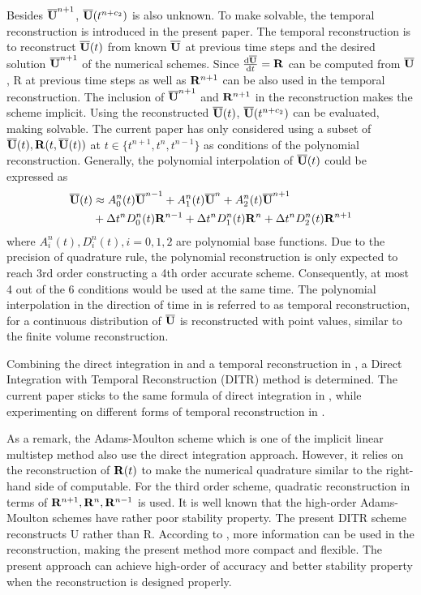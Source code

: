 Besides $\overline{\mathbf{U}}^{n+1}$, $\overline{\mathbf{U}}(t^{n+c_2})$ is also unknown.
To make 
solvable, the temporal reconstruction is introduced in the
present paper.
The temporal reconstruction is to reconstruct $\overline{\mathbf{U}}(t)$
from known $\overline{\mathbf{U}}$ at previous time steps and the desired
solution $\overline{\mathbf{U}}^{n+1}$ of the numerical schemes. Since $\frac{\dd\overline{\mathbf{U}}}{\dd t}=\mathbf{R}$
can be computed from  $\overline{\mathbf{U}}$, R at previous time steps as well
as  $\mathbf{R}^{n+1}$ can be also used in the temporal reconstruction.
The inclusion of $\overline{\mathbf{U}}^{n+1}$ and $\mathbf{R}^{n+1}$ in the reconstruction
makes the scheme implicit.
Using the reconstructed $\overline{\mathbf{U}}(t)$, $\overline{\mathbf{U}}(t^{n+c_2})$
can be evaluated, making  solvable.
The current paper has only considered using a subset of
$\overline{\mathbf{U}}(t), \mathbf{R}(t, \overline{\mathbf{U}}(t))$ at $t \in \{t^{n+1}, t^n, t^{n-1}\}$
as conditions of the polynomial reconstruction.
Generally, the polynomial interpolation
of $\overline{\mathbf{U}}(t)$ could be expressed as
\begin{equation}
    \begin{aligned}
        \label{eq:TR}
        \overline{\mathbf{U}}(t) & \approx
        A^n_0(t)\overline{\mathbf{U}}^{n - 1} +
        A^n_1(t)\overline{\mathbf{U}}^{n} +
        A^n_2(t)\overline{\mathbf{U}}^{n + 1}
        \\ & +
        \mathrm\Delta t^n D^n_0(t)\mathbf{R}^{n - 1} +
        \mathrm\Delta t^n D^n_1(t)\mathbf{R}^{n} +
        \mathrm\Delta t^n D^n_2(t)\mathbf{R}^{n + 1}
    \end{aligned}
\end{equation}
where $A^n_i(t), D^n_i(t), i=0,1,2$
are polynomial base functions. Due to the precision of quadrature rule,
the polynomial reconstruction is only expected to reach 3rd order
constructing a 4th order accurate scheme.
Consequently, at most 4 out of the
6 conditions would be used at the same time.
The polynomial interpolation in the direction of time in 
is referred to as temporal reconstruction, for
a continuous distribution of $\overline{\mathbf{U}}$ is reconstructed with point values,
similar to the finite volume reconstruction.

Combining the direct integration in 
and a  temporal reconstruction in ,
a Direct Integration with Temporal Reconstruction (DITR) method is
determined.
The current paper sticks to the same formula of direct integration
in , while experimenting on different
forms of temporal reconstruction in .

As a remark, the Adams-Moulton scheme which is one of the
implicit linear multistep method also use the direct
integration approach.
However, it relies on the
reconstruction of $\mathbf{R}(t)$ to make the numerical quadrature
similar to the right-hand side of  computable.
For the third order scheme, quadratic reconstruction in terms
of $\mathbf{R}^{n+1},\mathbf{R}^{n},\mathbf{R}^{n-1}$ is used.
It is well known that the high-order
Adams-Moulton schemes have rather poor stability
property. The present DITR scheme reconstructs U rather
than R. According to ,
more information can be used
in the reconstruction, making the present method more
compact and flexible. The present approach can achieve
high-order of accuracy and better stability property when
the reconstruction is designed properly.

